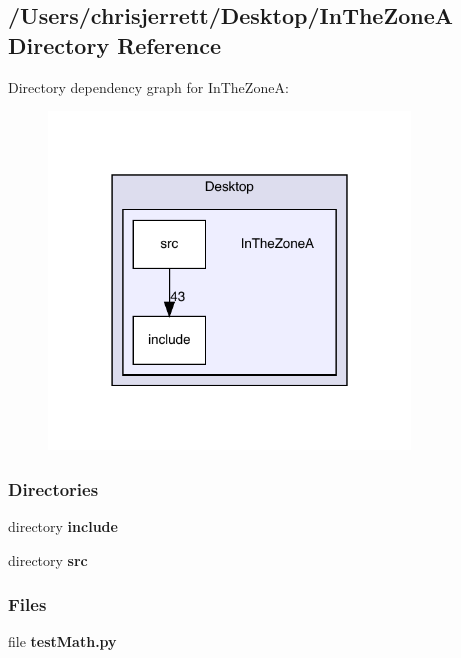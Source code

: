 \subsection{/\+Users/chrisjerrett/\+Desktop/\+In\+The\+ZoneA Directory Reference}
\label{dir_4b1cdeb3e831977d7bd328927b611244}
Directory dependency graph for In\+The\+ZoneA\+:
\nopagebreak
\begin{figure}[H]
\begin{center}
\leavevmode
\includegraphics[width=272pt]{dir_4b1cdeb3e831977d7bd328927b611244_dep}
\end{center}
\end{figure}
\subsubsection*{Directories}
\begin{DoxyCompactItemize}
\item 
directory \textbf{ include}
\item 
directory \textbf{ src}
\end{DoxyCompactItemize}
\subsubsection*{Files}
\begin{DoxyCompactItemize}
\item 
file \textbf{ test\+Math.\+py}
\end{DoxyCompactItemize}
